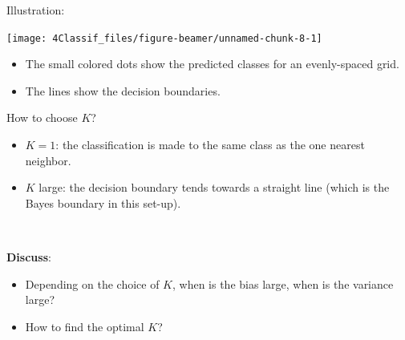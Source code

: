 \documentclass[
  10pt,
  ignorenonframetext,
]{beamer}
\providecommand{\tightlist}{%
  \setlength{\itemsep}{0pt}\setlength{\parskip}{0pt}}
\begin{document}
\begin{frame}
Illustration:

\begin{center}\texttt{[image: 4Classif\_files/figure-beamer/unnamed-chunk-8-1]} \end{center}

\vspace{2mm}

\scriptsize

\begin{itemize}
\tightlist
\item
  The small colored dots show the predicted classes for an evenly-spaced
  grid.
\item
  The lines show the decision boundaries.
\end{itemize}
\end{frame}

\begin{frame}
\begin{block}{How to choose \(K\)?}
\protect\hypertarget{how-to-choose-k}{}
\vspace{2mm}

\begin{itemize}
\tightlist
\item
  \(K=1\): the classification is made to the same class as the one
  nearest neighbor.
\end{itemize}

\vspace{2mm}

\begin{itemize}
\tightlist
\item
  \(K\) large: the decision boundary tends towards a straight line
  (which is the Bayes boundary in this set-up).
\end{itemize}

\vspace{2mm}

\(~\)

\textbf{Discuss}:

\vspace{2mm}

\begin{itemize}
\tightlist
\item
  Depending on the choice of \(K\), when is the bias large, when is the
  variance large?
\end{itemize}

\vspace{2mm}

\begin{itemize}
\tightlist
\item
  How to find the optimal \(K\)?
\end{itemize}
\end{block}
\end{frame}
\end{document}
